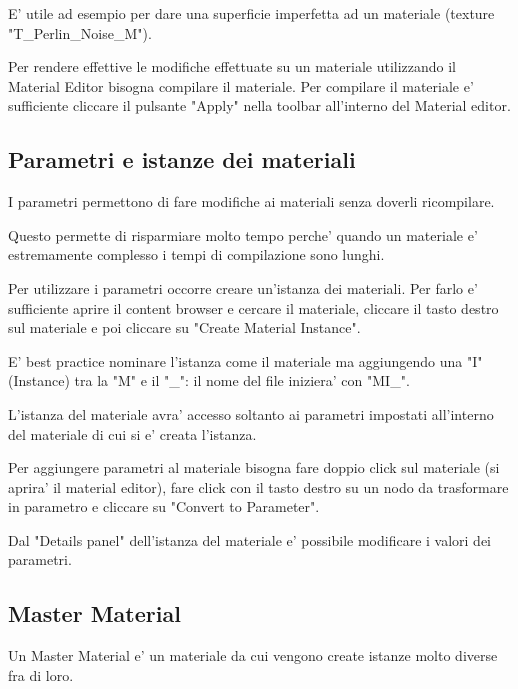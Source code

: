             \begin{notebox}
                E' utile ad esempio per dare una superficie imperfetta ad un materiale (texture "T\_Perlin\_Noise\_M").
            \end{notebox}

            \begin{notebox}
                Per rendere effettive le modifiche effettuate su un materiale utilizzando il Material Editor bisogna compilare il materiale. Per compilare il materiale e' sufficiente cliccare il pulsante "Apply" nella toolbar all'interno del Material editor.
            \end{notebox}

        \subsection{Parametri e istanze dei materiali}
            I parametri permettono di fare modifiche ai materiali senza doverli ricompilare.

            Questo permette di risparmiare molto tempo perche' quando un materiale e' estremamente complesso i tempi di compilazione sono lunghi.

            Per utilizzare i parametri occorre creare un'istanza dei materiali. Per farlo e' sufficiente aprire il content browser e cercare il materiale, cliccare il tasto destro sul materiale e poi cliccare su "Create Material Instance".

            \begin{notebox}
                E' best practice nominare l'istanza come il materiale ma aggiungendo una "I" (Instance) tra la "M" e il "\_": il nome del file iniziera' con "MI\_".
            \end{notebox}

            L'istanza del materiale avra' accesso soltanto ai parametri impostati all'interno del materiale di cui si e' creata l'istanza.

            Per aggiungere parametri al materiale bisogna fare doppio click sul materiale (si aprira' il material editor), fare click con il tasto destro su un nodo da trasformare in parametro e cliccare su "Convert to Parameter".

            Dal "Details panel" dell'istanza del materiale e' possibile modificare i valori dei parametri.

        \subsection{Master Material}
            Un Master Material e' un materiale da cui vengono create istanze molto diverse fra di loro.

